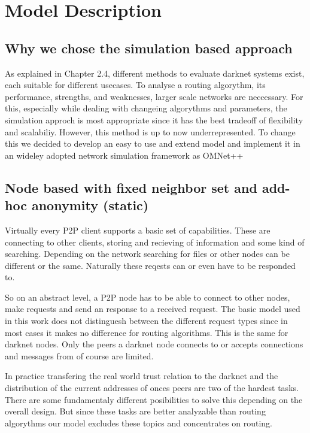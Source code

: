 \chapter{Model Description}

\section{Why we chose the simulation based approach}

As explained in Chapter 2.4, different methods to evaluate darknet systems exist, each suitable for different usecases. To analyse a routing algorythm, its performance, strengths, and weaknesses, larger scale networks are neccessary. For this, especially while dealing with changeing algorythms and parameters, the simulation approch is most appropriate since it has the best tradeoff of flexibility and scalabiliy. However, this method is up to now underrepresented. To change this we decided to develop an easy to use and extend model and implement it in an wideley adopted network simulation framework as OMNet++ 

\section{Node based with fixed neighbor set and add-hoc anonymity (static)}

Virtually every P2P client supports a basic set of capabilities. These are connecting to other clients, storing and recieving of information and some kind of searching. Depending on the network searching for files or other nodes can be different or the same. Naturally these reqests can or even have to be responded to.

So on an abstract level, a P2P node has to be able to connect to other nodes, make requests and send an response to a received request. The basic model used in this work does not distinguesh between the different request types since in most cases it makes no difference for routing algorithms. This is the same for darknet nodes. Only the peers a darknet node connects to or accepts connections and messages from of course are limited. 

In practice transfering the real world trust relation to the darknet and the distribution of the current addresses of onces peers are two of the hardest tasks. There are some fundamentaly different posibilities to solve this depending on the overall design. But since these tasks are better analyzable than routing algorythms our model excludes these topics and concentrates on routing.

